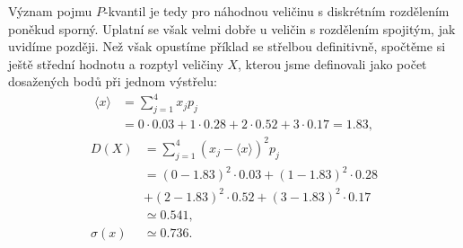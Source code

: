 \begin{mdframed}[style=mdexam]
\begin{example}
    Význam pojmu \(P\)-kvantil je tedy pro náhodnou veličinu s diskrétním rozdělením poněkud sporný.
    Uplatní se však velmi dobře u veličin s rozdělením spojitým, jak uvidíme později. Než však
    opustíme příklad se střelbou definitivně, spočtěme si ještě střední hodnotu a rozptyl veličiny
    \(X\), kterou jsme definovali jako počet dosažených bodů při jednom výstřelu:
    \begin{align*}
      \langle x \rangle 
          &= \sum_{j=1}^{4}x_jp_j                                                                \\
          &= 0\cdot\num{0.03} + 1\cdot\num{0.28}+ 2\cdot\num{0.52} + 3\cdot\num{0.17} = \num{1.83}, 
    \end{align*}
    \begin{align*}
      D(X)  &= \sum_{j=1}^{4}\left(x_j - \langle x \rangle \right)^2p_j                          \\
            &= (0-\num{1.83})^2\cdot\num{0.03}+(1-\num{1.83})^2\cdot\num{0.28}                   \\
            &+ (2-\num{1.83})^2\cdot\num{0.52}+(3-\num{1.83})^2\cdot\num{0.17}                   \\
                &\simeq\num{0.541},                                                              \\
      \sigma(x) &\simeq\num{0.736}.
    \end{align*}


\end{example}
\end{mdframed}
